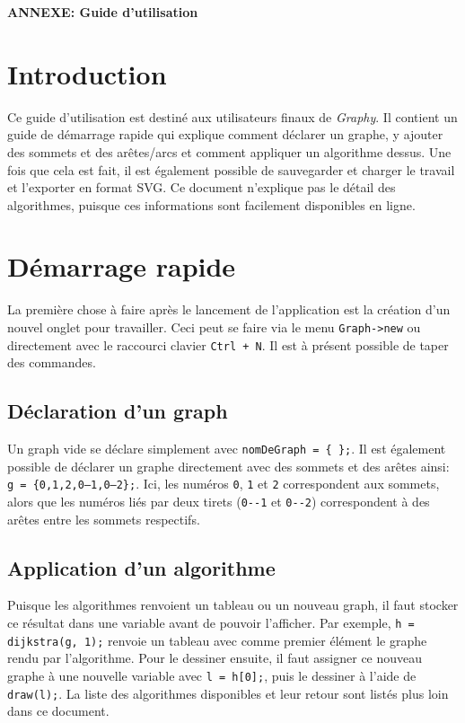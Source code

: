 \documentclass[french]{article}
\begin{document}
	\centering
	\large{\textbf{ANNEXE: Guide d'utilisation}}
	
	\justifying
	\normalsize
	
	\section{Introduction}
	Ce guide d'utilisation est destiné aux utilisateurs finaux de \textit{Graphy}. Il contient un guide de démarrage rapide qui explique comment déclarer un graphe, y ajouter des sommets et des arêtes/arcs et comment appliquer un algorithme dessus. Une fois que cela est fait, il est également possible de sauvegarder et charger le travail et l'exporter en format SVG. Ce document n'explique pas le détail des algorithmes, puisque ces informations sont facilement disponibles en ligne.
	
	\section{Démarrage rapide}
	La première chose à faire après le lancement de l'application est la création d'un nouvel onglet pour travailler. Ceci peut se faire via le menu \texttt{Graph->new} ou directement avec le raccourci clavier \texttt{Ctrl + N}. Il est à présent possible de taper des commandes.
	
		\subsection{Déclaration d'un graph}
		Un graph vide se déclare simplement avec \texttt{nomDeGraph = \{ \};}. Il est également possible de déclarer un graphe directement avec des sommets et des arêtes ainsi: \texttt{g = \{0,1,2,0--1,0--2\};}. Ici, les numéros \texttt{0}, \texttt{1} et \texttt{2} correspondent aux sommets, alors que les numéros liés par deux tirets (\texttt{0-{}-1} et \texttt{0-{}-2}) correspondent à des arêtes entre les sommets respectifs.
		
		\subsection{Application d'un algorithme}
		Puisque les algorithmes renvoient un tableau ou un nouveau graph, il faut stocker ce résultat dans une variable avant de pouvoir l'afficher. Par exemple, \texttt{h = dijkstra(g, 1);} renvoie un tableau avec comme premier élément le graphe rendu par l'algorithme. Pour le dessiner ensuite, il faut assigner ce nouveau graphe à une nouvelle variable avec \texttt{l = h[0];}, puis le dessiner à l'aide de \texttt{draw(l);}. La liste des algorithmes disponibles et leur retour sont listés plus loin dans ce document.
	
\end{document}
